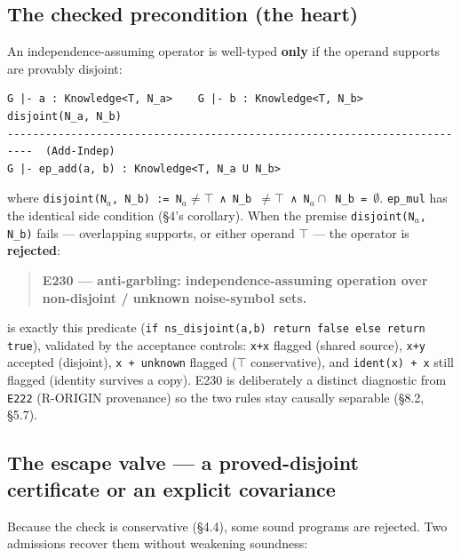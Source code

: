 \documentclass[sigplan,review,anonymous,10pt]{acmart}
\begin{document}
\subsection{The checked precondition (the heart)}

An independence-assuming operator is well-typed \textbf{only} if the operand supports are provably disjoint:

\begin{lstlisting}
G |- a : Knowledge<T, N_a>    G |- b : Knowledge<T, N_b>    disjoint(N_a, N_b)
--------------------------------------------------------------------------  (Add-Indep)
G |- ep_add(a, b) : Knowledge<T, N_a U N_b>
\end{lstlisting}

where \texttt{disjoint(N$_{a}$, N\_b) := N$_{a}\neq\top$ ∧ N\_b $\neq\top$ ∧ N$_{a}\cap$ N\_b = $\emptyset$}. \texttt{ep\_mul} has the identical side condition (§4's corollary). When the premise \texttt{disjoint(N$_{a}$, N\_b)} fails --- overlapping supports, or either operand \texttt{$\top$} --- the operator is \textbf{rejected}:

\begin{quote}
\textbf{E230 --- anti-garbling: independence-assuming operation over non-disjoint / unknown noise-symbol sets.}
\end{quote}

 is exactly this predicate (\texttt{if ns\_disjoint(a,b) return false else return true}), validated by the acceptance controls: \texttt{x+x} flagged (shared source), \texttt{x+y} accepted (disjoint), \texttt{x + unknown} flagged (\texttt{$\top$} conservative), and \texttt{ident(x) + x} still flagged (identity survives a copy). E230 is deliberately a distinct diagnostic from \texttt{E222} (R-ORIGIN provenance) so the two rules stay causally separable (§8.2, §5.7).

\subsection{The escape valve --- a proved-disjoint certificate or an explicit covariance}

Because the check is conservative (§4.4), some sound programs are rejected. Two admissions recover them without weakening soundness:
\end{document}
